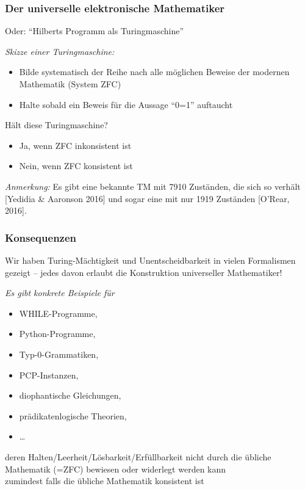 \documentclass[aspectratio=1610,onlymath]{beamer}
\begin{document}
\begin{frame}\frametitle{Der universelle elektronische Mathematiker}

Oder: "`Hilberts Programm als Turingmaschine"'
\bigskip

\emph{Skizze einer Turingmaschine:}
\begin{itemize}
\item Bilde systematisch der Reihe nach alle möglichen Beweise der modernen Mathematik (System ZFC)
\item Halte sobald ein Beweis für die Aussage "`0=1"' auftaucht
\end{itemize}
\alert{Hält diese Turingmaschine?}\pause
\begin{itemize}
\item Ja, wenn ZFC inkonsistent ist
\item Nein, wenn ZFC konsistent ist
\end{itemize}\pause
\bigskip

\pause\medskip

\emph{Anmerkung:} Es gibt eine bekannte TM mit 7910 Zuständen, die sich so verhält [Yedidia \& Aaronson 2016] und sogar eine mit nur 1919 Zuständen [O’Rear, 2016].

\end{frame}

\begin{frame}\frametitle{Konsequenzen}

Wir haben Turing-Mächtigkeit und Unentscheidbarkeit in vielen Formalismen gezeigt -- jedes davon erlaubt die Konstruktion universeller Mathematiker!
\bigskip

\emph{Es gibt konkrete Beispiele für}
\begin{itemize}
\item WHILE-Programme,
\item Python-Programme,
\item Typ-0-Grammatiken,
\item PCP-Instanzen,
\item diophantische Gleichungen,
\item prädikatenlogische Theorien,
\item \ldots
\end{itemize}
deren Halten/Leerheit/Lösbarkeit/Erfüllbarkeit nicht durch die übliche Mathematik (=ZFC) bewiesen oder widerlegt werden kann\\[-0.5ex]
{\tiny zumindest falls die übliche Mathematik konsistent ist}

\end{frame}
\end{document}
